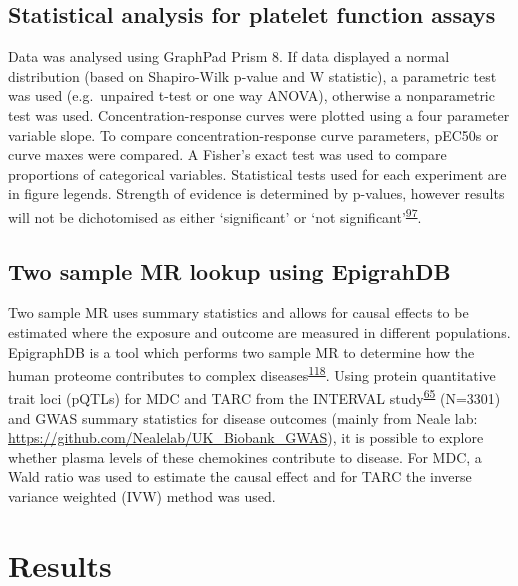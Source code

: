 \documentclass[11pt,twoside]{bristolthesis}
\begin{document}
\hypertarget{statistical-analysis-for-platelet-function-assays-1}{%
\subsection{Statistical analysis for platelet function assays}\label{statistical-analysis-for-platelet-function-assays-1}}

Data was analysed using GraphPad Prism 8. If data displayed a normal distribution (based on Shapiro-Wilk p-value and W statistic), a parametric test was used (e.g.~unpaired t-test or one way ANOVA), otherwise a nonparametric test was used. Concentration-response curves were plotted using a four parameter variable slope. To compare concentration-response curve parameters, pEC50s or curve maxes were compared. A Fisher's exact test was used to compare proportions of categorical variables. Statistical tests used for each experiment are in figure legends. Strength of evidence is determined by p-values, however results will not be dichotomised as either `significant' or `not significant'\textsuperscript{\protect\hyperlink{ref-Sterne2001}{97}}.

\hypertarget{two-sample-mr-lookup-using-epigrahdb}{%
\subsection{Two sample MR lookup using EpigrahDB}\label{two-sample-mr-lookup-using-epigrahdb}}

Two sample MR uses summary statistics and allows for causal effects to be estimated where the exposure and outcome are measured in different populations. EpigraphDB is a tool which performs two sample MR to determine how the human proteome contributes to complex diseases\textsuperscript{\protect\hyperlink{ref-Zheng2020}{118}}. Using protein quantitative trait loci (pQTLs) for MDC and TARC from the INTERVAL study\textsuperscript{\protect\hyperlink{ref-Sun2018}{65}} (N=3301) and GWAS summary statistics for disease outcomes (mainly from Neale lab: \url{https://github.com/Nealelab/UK_Biobank_GWAS}), it is possible to explore whether plasma levels of these chemokines contribute to disease. For MDC, a Wald ratio was used to estimate the causal effect and for TARC the inverse variance weighted (IVW) method was used.

\hypertarget{results-2}{%
\section{Results}\label{results-2}}
\end{document}
